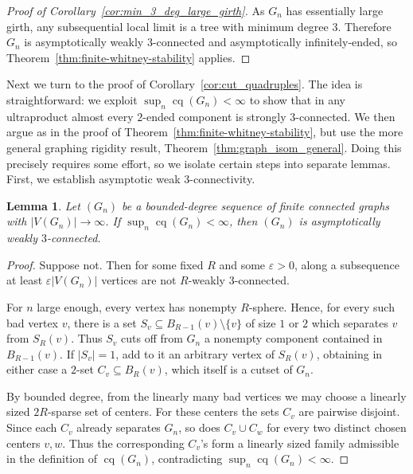 \documentclass{article}
\theoremstyle{plain}
\newtheorem{lem}[thm]{Lemma}
\theoremstyle{definition}
\begin{document}
\begin{proof}[Proof of Corollary~\ref{cor:min_3_deg_large_girth}]
As $G_n$ has essentially large girth, any subsequential local limit is a tree with minimum degree 3. Therefore $G_n$ is asymptotically weakly $3$-connected and asymptotically infinitely-ended, so Theorem~\ref{thm:finite-whitney-stability} applies.
\end{proof}

Next we turn to the proof of Corollary~\ref{cor:cut_quadruples}. The idea is straightforward: we exploit $\sup_n \operatorname{cq}(G_n) < \infty $ to show that in any ultraproduct almost every $2$-ended component is strongly $3$-connected. We then argue as in the proof of Theorem~\ref{thm:finite-whitney-stability}, but use the more general graphing rigidity result, Theorem~\ref{thm:graph_isom_general}. Doing this precisely requires some effort, so we isolate certain steps into separate lemmas. First, we establish asymptotic weak $3$-connectivity.

\begin{lem}\label{lem:bounded_r_implies_weak_3-conn}    
    Let \((G_n)\) be a bounded-degree sequence of finite connected graphs with \(|V(G_n)|\to\infty\). If $\sup_n \operatorname{cq}(G_n)<\infty$, then \((G_n)\) is asymptotically weakly \(3\)-connected.
\end{lem}

\begin{proof}
    Suppose not. Then for some fixed \(R\) and some \(\varepsilon>0\), along a subsequence at least \(\varepsilon |V(G_n)|\) vertices are not \(R\)-weakly \(3\)-connected.

    For \(n\) large enough, every vertex has nonempty \(R\)-sphere. Hence, for every such bad vertex \(v\), there is a set \(S_v\subseteq B_{R-1}(v)\setminus\{v\}\) of size \(1\) or \(2\) which separates \(v\) from \(S_R(v)\). Thus \(S_v\) cuts off from \(G_n\) a nonempty component contained in \(B_{R-1}(v)\). If \(|S_v|=1\), add to it an arbitrary vertex of \(S_R(v)\), obtaining in either case a \(2\)-set $C_v\subseteq B_R(v)$, which itself is a cutset of \(G_n\).

    By bounded degree, from the linearly many bad vertices we may choose a linearly sized \(2R\)-sparse set of centers. For these centers the sets \(C_v\) are pairwise disjoint. Since each \(C_v\) already separates \(G_n\), so does \(C_v\cup C_w\) for every two distinct chosen centers \(v,w\). Thus the corresponding \(C_v\)'s form a linearly sized family admissible in the definition of \(\operatorname{cq}(G_n)\), contradicting \(\sup_n \operatorname{cq}(G_n)<\infty\). 
\end{proof} 
\end{document}
